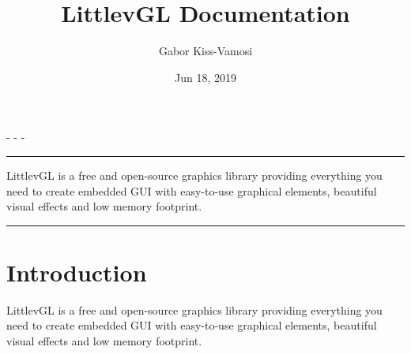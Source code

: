 \documentclass[letterpaper,10pt,english]{sphinxmanual}
\title{LittlevGL Documentation}
\date{Jun 18, 2019}
\author{Gabor Kiss-Vamosi}
\begin{document}
\pagestyle{empty}
\sphinxmaketitle
\pagestyle{plain}
\sphinxtableofcontents
\pagestyle{normal}
\label{\detokenize{index::doc}}
 -
 -
 -


\bigskip\hrule\bigskip





LittlevGL is a free and open-source graphics library providing everything you need to create embedded GUI with easy-to-use graphical elements, beautiful visual effects and low memory footprint.


\bigskip\hrule\bigskip



\chapter{Introduction}
\label{\detokenize{intro:introduction}}\label{\detokenize{intro::doc}}
LittlevGL is a free and open-source graphics library providing everything you need to create embedded GUI with easy-to-use graphical elements, beautiful visual effects and low memory footprint.
\end{document}
